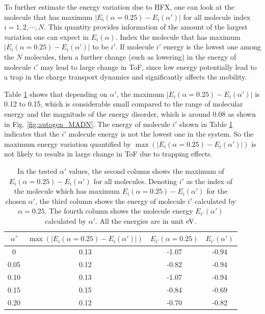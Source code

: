 \documentclass[%
 reprint,
superscriptaddress,
 amsmath,amssymb,
 aps,
prb,
floatfix
]{revtex4-2}
\begin{document}
To further estimate the energy variation due to HFX, one can look at the molecule that has maximum $|E_i(\alpha=0.25) - E_i(\alpha')|$ for all molecule index $i=1,2,\cdots,N$. 
This quantity provides information of the amount of the largest variation one can expect in $E_i(\alpha)$. Index the molecule that has maximum $|E_i(\alpha=0.25) - E_i(\alpha')|$ to be $i'$. 
If molecule $i'$ energy is the lowest one among the $N$ molecules, then a further change (such as lowering) in the energy of molecule $i'$ may lead to large change in ToF, since low energy potentially lead to a trap in the charge transport dynamics and significantly affects the mobility. 

Table \ref{tab:maxEi} shows that depending on $\alpha'$, the maximum $|E_i(\alpha=0.25) - E_i(\alpha')|$ is 0.12 to 0.15, which is considerable small compared to the range of molecular energy and the magnitude of the energy disorder, which is around 0.08 as shown in Fig. \ref{fig:autogen_MADN}. 
The energy of molecule $i'$ shown in Table \ref{tab:maxEi} indicates that the $i'$ molecule energy is not the lowest one in the system. So the maximum energy variation quantified by $\max(|E_i(\alpha=0.25) - E_i(\alpha')|)$ is not likely to results in large change in ToF due to trapping effects. 
%
\begin{table}[tbp]%
\caption{\label{tab:maxEi}%
In the tested $\alpha'$ values, the second column shows the maximum of $E_i(\alpha=0.25) - E_i(\alpha')$ for all molecules. Denoting $i'$ as the index of the molecule which has maximum $E_i(\alpha=0.25) - E_i(\alpha')$ for the chosen $\alpha'$, the third column shows the energy of molecule $i'$ calculated by $\alpha=0.25$. The fourth column shows the molecule energy $E_{i'}(\alpha')$ calculated by $\alpha'$. All the energies are in unit $\unit[]{eV}$.
}
\begin{ruledtabular}
  \begin{tabular}{c c c c}
  $\alpha'$ & $\max(|E_i(\alpha=0.25) - E_i(\alpha')|)$  & $E_{i'}(\alpha=0.25)$ & $E_{i'}(\alpha')$ \\
    \hline
  0 & 0.13 &  -1.07 & -0.94 \\
  0.05 & 0.12 & -0.82 & -0.94 \\
  0.10 & 0.13 & -1.07 & -0.94 \\
  0.15 & 0.15 & -0.84 & -0.69 \\
  0.20 & 0.12 & -0.70 & -0.82 \\
    \end{tabular}
\end{ruledtabular}
\end{table}
\end{document}
